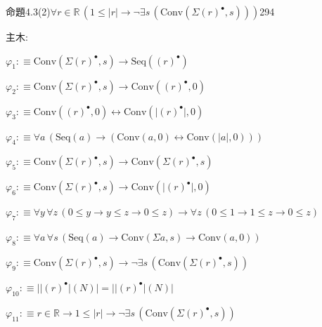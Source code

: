 \begin{fullproof}{命題4.3(2)}{$\forall r \in \mathbb{R}\,(1 \leq \lvert r \rvert \to \neg \exists s\,(\mathrm{Conv}(\Sigma {(r)^{\bullet}},s)))$}{294}
\begin{ptree}
\end{ptree}
\noindent 主木:
\begin{ptree}
\noLine
{}
\end{ptree}
\begin{abbrevlist}
\item $\varphi_{1} :\equiv \mathrm{Conv}(\Sigma {(r)^{\bullet}},s) \to \mathrm{Seq}({(r)^{\bullet}})$
\item $\varphi_{2} :\equiv \mathrm{Conv}(\Sigma {(r)^{\bullet}},s) \to \mathrm{Conv}({(r)^{\bullet}},0)$
\item $\varphi_{3} :\equiv \mathrm{Conv}({(r)^{\bullet}},0) \leftrightarrow \mathrm{Conv}(\lvert {(r)^{\bullet}} \rvert,0)$
\item $\varphi_{4} :\equiv \forall a\,(\mathrm{Seq}(a) \to (\mathrm{Conv}(a,0) \leftrightarrow \mathrm{Conv}(\lvert a \rvert,0)))$
\item $\varphi_{5} :\equiv \mathrm{Conv}(\Sigma {(r)^{\bullet}},s) \to \mathrm{Conv}(\Sigma {(r)^{\bullet}},s)$
\item $\varphi_{6} :\equiv \mathrm{Conv}(\Sigma {(r)^{\bullet}},s) \to \mathrm{Conv}(\lvert {(r)^{\bullet}} \rvert,0)$
\item $\varphi_{7} :\equiv \forall y\,\forall z\,(0 \leq y \to y \leq z \to 0 \leq z) \to \forall z\,(0 \leq 1 \to 1 \leq z \to 0 \leq z)$
\item $\varphi_{8} :\equiv \forall a\,\forall s\,(\mathrm{Seq}(a) \to \mathrm{Conv}(\Sigma a,s) \to \mathrm{Conv}(a,0))$
\item $\varphi_{9} :\equiv \mathrm{Conv}(\Sigma {(r)^{\bullet}},s) \to \neg \exists s\,(\mathrm{Conv}(\Sigma {(r)^{\bullet}},s))$
\item $\varphi_{10} :\equiv \lvert \lvert {(r)^{\bullet}} \rvert(N) \rvert = \lvert \lvert {(r)^{\bullet}} \rvert(N) \rvert$
\item $\varphi_{11} :\equiv r \in \mathbb{R} \to 1 \leq \lvert r \rvert \to \neg \exists s\,(\mathrm{Conv}(\Sigma {(r)^{\bullet}},s))$

\end{abbrevlist}
\end{fullproof}
